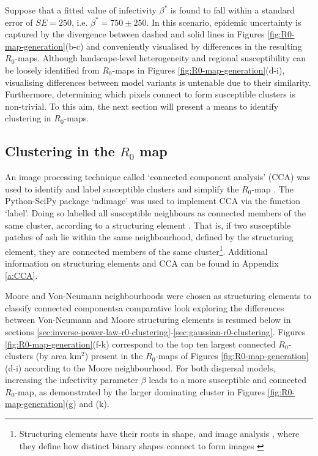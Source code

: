 Suppose that a fitted value of infectivity $\beta^*$ is found to fall within a standard error of $SE=250$,  i.e. $\beta^* = 750 \pm 250$.
In this scenario, epidemic uncertainty is captured by the divergence between dashed and solid lines in Figures \ref{fig:R0-map-generation}(b-c)
and conveniently visualised by differences in the resulting $R_0$-maps.
Although landscape-level heterogeneity and regional susceptibility can be loosely identified from $R_0$-maps in Figures \ref{fig:R0-map-generation}(d-i),
visualising differences between model variants is untenable due to their similarity. 
Furthermore, determining which pixels connect to form susceptible clusters is non-trivial. 
To this aim, the next section will present a means to identify clustering in $R_0$-maps.

\subsection{Clustering in the $R_0$ map}
\label{sec:r0-clustering}

An image processing technique called `connected component analysis' (CCA) was used to identify and label susceptible clusters and simplify the $R_0$-map \cite{CCA1, CCA2} . 
The Python-SciPy package `ndimage' \cite{scipy} was used to implement CCA via the function `label'. 
Doing so labelled all susceptible neighbours as connected members of the same cluster, according to a structuring element \cite{liang1989erosion}. 
That is, if two susceptible patches of ash lie within the same neighbourhood, defined by the structuring element, they are connected members of the same cluster\footnote{Structuring elements have their roots in shape, and image analysis \cite{23111}, where they define how distinct binary shapes connect to form images \cite{liang1989erosion, nachtegael2001connections}}. 
Additional information on structuring elements and CCA can be found in Appendix \ref{a:CCA}.

Moore and Von-Neumann neighbourhoods were chosen as structuring elements to classify connected components\textemdash a comparative look exploring the differences between Von-Neumann and Moore 
structuring elements is resumed below in sections \ref{sec:inverse-power-law-r0-clustering}-\ref{sec:gaussian-r0-clustering}.  
Figures \ref{fig:R0-map-generation}(f-k) correspond to the top ten largest connected $R_0$-clusters (by area $\mathrm{km^2}$) present in the $R_0$-maps of Figures \ref{fig:R0-map-generation}(d-i) according to the Moore neighbourhood.
For both dispersal models, increasing the infectivity parameter $\beta$ leads to a more susceptible and connected $R_0$-map, as demonstrated by the larger dominating cluster in Figures \ref{fig:R0-map-generation}(g) and (k).

